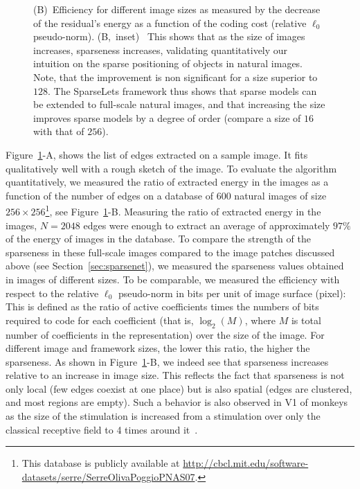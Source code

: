 \documentclass[a4paper, 11pt]{book}
\begin{document}
\begin{figure}[ht!]
{\textsf{(B)}~Efficiency for different image sizes as measured by the decrease of the residual's energy as a function of the coding cost
(relative $\ell_0$ pseudo-norm).
\textsf{(B,~inset)}~%
This shows that as the size of images increases, sparseness increases,
validating quantitatively our intuition on the sparse positioning of objects in natural images.
Note, that the improvement is non significant for a size superior to $128$.
The SparseLets framework thus shows that sparse models can be extended to full-scale natural images, and that increasing the size improves sparse models by a degree of order (compare a size of $16$ with that of $256$).
\label{fig:SparseLets}}%
\end{figure}%

Figure~\ref{fig:SparseLets}-A, shows the list of edges extracted on a sample image. It fits qualitatively well with a rough sketch of the image.
To evaluate the algorithm quantitatively,
we measured the ratio of extracted energy in the images as a function of the number of edges
on a database of 600 natural images  of size $256\times 256$\footnote{This database is publicly available at \url{http://cbcl.mit.edu/software-datasets/serre/SerreOlivaPoggioPNAS07}.}, see Figure~\ref{fig:SparseLets}-B.
Measuring the ratio of extracted energy in the images, $N=2048$ edges were
enough to extract an average of approximately $97\%$ of the energy of images in the database. %
To compare the strength of the sparseness in these full-scale images
compared to the image patches discussed above (see Section~\ref{sec:sparsenet}),
we measured the sparseness values obtained in images of different sizes.
To be comparable, we measured the efficiency with respect to the relative $\ell_0$ pseudo-norm in bits per unit of image surface (pixel):
This is defined as the ratio of active coefficients times the numbers of bits required to code for each coefficient (that is, $\log_2(M)$, where $M$ is total number of coefficients in the representation) over the size of the image.
For different image and framework sizes, the lower this ratio, the higher the sparseness.
As shown in Figure~\ref{fig:SparseLets}-B,
we indeed see that sparseness increases relative to an increase in image size.
This reflects the fact that sparseness is not only local (few edges coexist at one place)
but is also spatial (edges are clustered, and most regions are empty).
Such a behavior is also observed in V1 of monkeys
as the size of the stimulation is increased from a stimulation over only the classical receptive field
to 4 times around it~\citep{Vinje00}.
\end{document}
